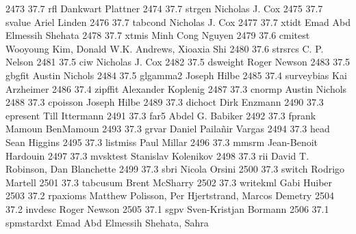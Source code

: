   2473     37.7    rfl           Dankwart Plattner                       
  2474     37.7    strgen        Nicholas J. Cox                         
  2475     37.7    svalue        Ariel Linden                            
  2476     37.7    tabcond       Nicholas J. Cox                         
  2477     37.7    xtidt         Emad Abd Elmessih Shehata               
  2478     37.7    xtmis         Minh Cong Nguyen                        
  2479     37.6    cmitest       Wooyoung Kim, Donald W.K. Andrews,      
                                   Xioaxia Shi                             
  2480     37.6    strsrcs       C. P. Nelson                            
  2481     37.5    ciw           Nicholas J. Cox                         
  2482     37.5    dsweight      Roger Newson                            
  2483     37.5    gbgfit        Austin Nichols                          
  2484     37.5    glgamma2      Joseph Hilbe                            
  2485     37.4    surveybias    Kai Arzheimer                           
  2486     37.4    zipffit       Alexander Koplenig                      
  2487     37.3    cnormp        Austin Nichols                          
  2488     37.3    cpoisson      Joseph Hilbe                            
  2489     37.3    dichoct       Dirk Enzmann                            
  2490     37.3    epresent      Till Ittermann                          
  2491     37.3    far5          Abdel G. Babiker                        
  2492     37.3    fprank        Mamoun BenMamoun                        
  2493     37.3    grvar         Daniel Pailañir Vargas                 
  2494     37.3    head          Sean Higgins                            
  2495     37.3    listmiss      Paul Millar                             
  2496     37.3    mmsrm         Jean-Benoit Hardouin                    
  2497     37.3    mvsktest      Stanislav Kolenikov                     
  2498     37.3    rii           David T. Robinson, Dan Blanchette       
  2499     37.3    sbri          Nicola Orsini                           
  2500     37.3    switch        Rodrigo Martell                         
  2501     37.3    tabcusum      Brent McSharry                          
  2502     37.3    writekml      Gabi Huiber                             
  2503     37.2    rpaxioms      Matthew Polisson, Per Hjertstrand,      
                                   Marcos Demetry                          
  2504     37.2    invdesc       Roger Newson                            
  2505     37.1    sgpv          Sven-Kristjan Bormann                   
  2506     37.1    spmstardxt    Emad Abd Elmessih Shehata, Sahra        
